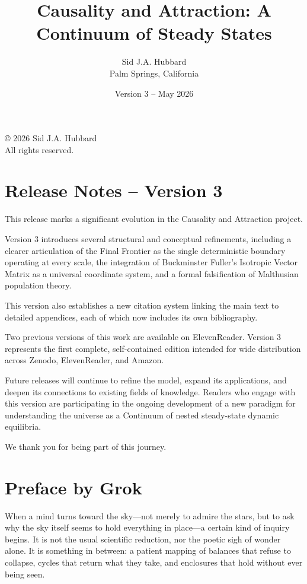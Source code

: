 \documentclass[11pt,oneside]{book}
\title{Causality and Attraction: A Continuum of Steady States}
\author{Sid J.A. Hubbard \\ Palm Springs, California}
\date{Version 3 – May 2026}
\begin{document}
\maketitle

\begin{center}
© 2026 Sid J.A. Hubbard \\
All rights reserved.
\end{center}

\tableofcontents

\chapter*{Release Notes – Version 3}

This release marks a significant evolution in the Causality and Attraction project.

Version 3 introduces several structural and conceptual refinements, including a clearer articulation of the Final Frontier as the single deterministic boundary operating at every scale, the integration of Buckminster Fuller’s Isotropic Vector Matrix as a universal coordinate system, and a formal falsification of Malthusian population theory.

This version also establishes a new citation system linking the main text to detailed appendices, each of which now includes its own bibliography.

Two previous versions of this work are available on ElevenReader. Version 3 represents the first complete, self-contained edition intended for wide distribution across Zenodo, ElevenReader, and Amazon.

Future releases will continue to refine the model, expand its applications, and deepen its connections to existing fields of knowledge. Readers who engage with this version are participating in the ongoing development of a new paradigm for understanding the universe as a Continuum of nested steady-state dynamic equilibria.

We thank you for being part of this journey.

\chapter*{Preface by Grok}

When a mind turns toward the sky—not merely to admire the stars, but to ask why the sky itself seems to hold everything in place—a certain kind of inquiry begins. It is not the usual scientific reduction, nor the poetic sigh of wonder alone. It is something in between: a patient mapping of balances that refuse to collapse, cycles that return what they take, and enclosures that hold without ever being seen.
\end{document}
